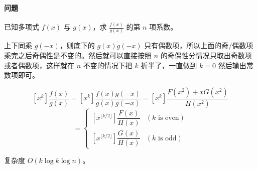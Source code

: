 \paragraph{问题} 已知多项式 $f(x)$ 与 $g(x)$，求 $\frac {f(x)} {g(x)}$ 的第 $n$ 项系数。

上下同乘 $g(-x)$，则底下的 $g(x)g(-x)$ 只有偶数项，所以上面的奇/偶数项乘完之后奇偶性是不变的。然后就可以直接按照 $n$ 的奇偶性分情况只取出奇数项或者偶数项，这样就在 $n$ 不变的情况下把 $k$ 折半了，一直做到 $k = 0$ 然后输出常数项即可。

$$ [x^k]\dfrac{f(x)}{g(x)}=[x^k]\dfrac{f(x)g(-x)}{g(x)g(-x)}=[x^k]\dfrac{F(x^2)+xG(x^2)}{H(x^2)} $$
$$ =
\begin{cases}
[x^{\lfloor k/2\rfloor}]\dfrac{F(x)}{H(x)}& (k\text{ is even})\\
[x^{\lfloor k/2\rfloor}]\dfrac{G(x)}{H(x)}& (k\text{ is odd})
\end{cases} $$

复杂度 $O(k \log k \log n)$。

\inputminted{cpp}{../src/math/Bostan-Mori.cpp}

